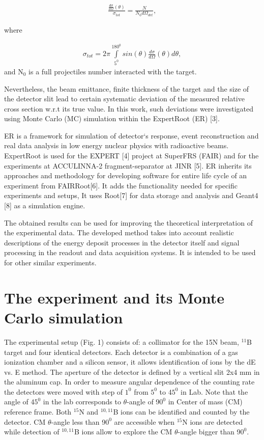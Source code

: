 \documentclass[%
 aip,
cp,  %
 amsmath,amssymb,%
 reprint,%
]{revtex4-2}
\begin{document}
\begin{eqnarray}
 \frac{ \frac{d\sigma}{d\Omega}(\theta) }{\sigma_{tot}} = \frac{N}{N_0 d\Omega_{det}},
\end{eqnarray}

where

\begin{eqnarray}
  \sigma_{tot} = 2\pi \int\limits_{5^{0}}^{180^{0}} sin(\theta)\frac{d\sigma}{d\Omega}(\theta)d\theta,
 \end{eqnarray}
and N$_{0}$ is a full projectiles number interacted with the target.

Nevertheless, the beam emittance, finite thickness of the target and the size of the detector slit lead to certain systematic deviation of the measured relative cross section w.r.t its true value. In this work, such deviations were investigated using Monte Carlo (MC) simulation within the ExpertRoot (ER) [3].

ER is a framework for simulation of detector`s response, event reconstruction and real data analysis in low energy nuclear physics with radioactive beams. ExpertRoot is used for the EXPERT [4] project at SuperFRS (FAIR) and for the experiments at ACCULINNA-2 fragment-separator at JINR [5].  ER inherits its approaches and methodology for developing software for entire life cycle of an experiment from FAIRRoot[6]. It adds the functionality needed for specific experiments and setups, It uses Root[7] for data storage and analysis and Geant4 [8] as a simulation engine.

The obtained results can be used for improving the theoretical interpretation of the experimental data. The developed method takes into account realistic descriptions of the energy deposit processes in the detector itself and signal processing in the readout and data acquisition systems. It is intended to be used for other similar experiments.

\section{The experiment and its Monte Carlo simulation}

The experimental setup (Fig. 1) consists of: a collimator for the 15N beam, ${}^{11}$B target and four identical detectors. Each detector is a combination of a gas ionization chamber and a silicon sensor, it allows identification of ions by the dE vs. E method. The aperture of the detector is defined by a vertical slit 2x4 mm in the aluminum cap. In order to measure angular dependence of the counting rate the detectors were moved with step of $1^0$  from $5^0$ to 4$5^0$ in Lab. Note that the angle of 4$5^0$ in the lab corresponds to $\theta$-angle of 9$0^0$  in Center of mass (CM) reference frame. Both ${}^{15}$N and ${}^{10,11}$B ions can be identified and counted by the detector. CM $\theta$-angle less than 9$0^0$  are accessible when ${}^{15}$N ions are detected while detection of ${}^{10,11}$B ions allow to explore the CM $\theta$-angle bigger than 9$0^0$.
\end{document}
